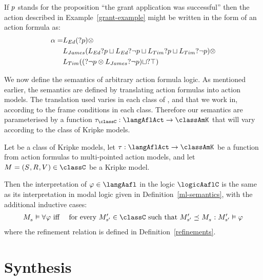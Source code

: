 \begin{example}\label{grant-example-formula}
If $\atomP$ stands for the proposition ``the grant application was successful'' then the action described in Example~\ref{grant-example} might be written in the form of an action formula as:
\begin{align*}
    \alpha = &\learns[Ed] (\test{\atomP}) \compose\\
    &\learns[James] (\learns[Ed] \test{\atomP} \choice \learns[Ed] \test{\neg \atomP} \choice \learns[Tim] \test{\atomP} \choice \learns[Tim] \test{\neg \atomP}) \compose\\
    &\learns[Tim] ((\test{\neg \atomP} \compose \learns[James] \test{\neg \atomP}) \choice \test{\top})
\end{align*}
\end{example}

We now define the semantics of arbitrary action formula logic.
As mentioned earlier, the semantics are defined by translating action formulas into action models.
The translation used varies in each class of \classK{}, \classKFF{} and \classS{} that we work in, according to the frame conditions in each class.
Therefore our semantics are parameterised by a function $\tau_\classC: \langAflAct \to \classAmK$ that will vary according to the class of Kripke models.

\begin{definition}
Let \classC{} be a class of Kripke models, let $\tau : \langAflAct \to \classAmK$ be a function from action formulas to multi-pointed action models, and let $\kModel = \kModelTuple \in \classC$ be a Kripke model.

Then the interpretation of $\phi \in \langAafl$ in the logic $\logicAaflC$ is the same as its interpretation in modal logic given in Definition~\ref{ml-semantics}, with the additional inductive cases:
\begin{eqnarray*}
    \kPModel{\kStateS} \entails \allrefs \phi &\text{ iff }& \text{for every } \kPModelP{\kStateSP} \in \classC \text{ such that } \kPModelP{\kStateSP} \refines \kPModel{\kStateS}: \kPModelP{\kStateSP} \entails \phi
\end{eqnarray*}
where the refinement relation is defined in Definition~\ref{refinements}.
\end{definition}

\section{Synthesis}\label{synthesis}

